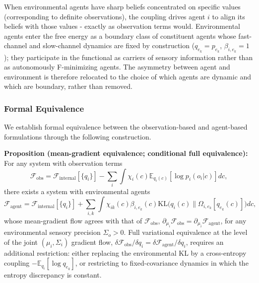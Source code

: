 \documentclass[11pt]{article}
\begin{document}
When environmental agents have sharp beliefs concentrated on specific values (corresponding to definite observations), the coupling drives agent $i$ to align its beliefs with those values - exactly as observation terms would. Environmental agents enter the free energy as a boundary class of constituent agents whose fast-channel and slow-channel dynamics are fixed by construction ($q_{e_k} = p_{e_k}$, $\beta_{i,e_k} = 1$); they participate in the functional as carriers of sensory information rather than as autonomously F-minimizing agents. The asymmetry between agent and environment is therefore relocated to the choice of which agents are dynamic and which are boundary, rather than removed.

\subsubsection{Formal Equivalence}

We establish formal equivalence between the observation-based and agent-based formulations through the following construction.

\textbf{Proposition (mean-gradient equivalence; conditional full equivalence):} For any system with observation terms
\begin{equation}
\mathcal{F}_{\text{obs}} = \mathcal{F}_{\text{internal}}[\{q_i\}] - \sum_i \int \chi_i(c)  \mathbb{E}_{q_i(c)}[\log p_i(o_i|c)]  dc,
\end{equation}
there exists a system with environmental agents
\begin{equation}
\mathcal{F}_{\text{agent}} = \mathcal{F}_{\text{internal}}[\{q_i\}] + \sum_{i,k} \int \chi_{ik}(c)  \beta_{i,e_k}(c)  \mathrm{KL}\big(q_i(c) \| \Omega_{i,e_k}[q_{e_k}(c)]\big)  dc,
\end{equation}
whose mean-gradient flow agrees with that of $\mathcal{F}_{\text{obs}}$, $\partial_{\mu_i}\mathcal{F}_{\text{obs}} = \partial_{\mu_i}\mathcal{F}_{\text{agent}}$, for any environmental sensory precision $\Sigma_o > 0$. Full variational equivalence at the level of the joint $(\mu_i, \Sigma_i)$ gradient flow, $\delta \mathcal{F}_{\text{obs}}/\delta q_i = \delta \mathcal{F}_{\text{agent}}/\delta q_i$, requires an additional restriction: either replacing the environmental KL by a cross-entropy coupling $-\mathbb{E}_{q_i}[\log q_{e_k}]$, or restricting to fixed-covariance dynamics in which the entropy discrepancy is constant.
\end{document}
